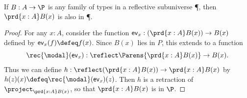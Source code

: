 %
\begin{thm}\label{thm:reflsubunv-forall}
  If $B:A\to\P$ is any family of types in a reflective subuniverse \P, then $\prd{x:A} B(x)$ is also in \P.
\end{thm}

\begin{proof}
  For any $x:A$, consider the function $\mathsf{ev}_x : (\prd{x:A} B(x)) \to B(x)$ defined by $\mathsf{ev}_x(f) \defeq f(x)$.
  Since $B(x)$ lies in $P$, this extends to a function
  \[ \rec{\modal}(\mathsf{ev}_x) : \reflect\Parens{\prd{x:A} B(x)} \to B(x). \]
  Thus we can define $h:\reflect(\prd{x:A} B(x)) \to \prd{x:A} B(x)$ by $h(z)(x) \defeq \rec{\modal}(\mathsf{ev}_x)(z)$.
  Then $h$ is a retraction of $\project_{\prd{x:A} B(x)}$, so that ${\prd{x:A} B(x)}$ is in $\P$.
\end{proof}
